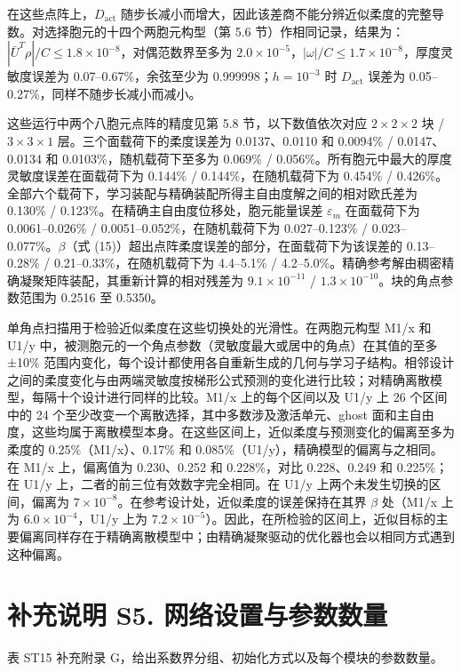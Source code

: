 \documentclass[preprint,12pt,authoryear]{elsarticle}
\begin{document}
在这些点阵上，\(D_{\mathrm{act}}\) 随步长减小而增大，因此该差商不能分辨近似柔度的完整导数。对选择胞元的十四个两胞元构型（第 5.6 节）作相同记录，结果为：\(|\bar U^T\rho|/C\le1.8\times10^{-8}\)，对偶范数界至多为 \(2.0\times10^{-5}\)，\(|\omega|/C\le1.7\times10^{-8}\)，厚度灵敏度误差为 0.07--0.67\%，余弦至少为 0.999998；\(h=10^{-3}\) 时 \(D_{\mathrm{act}}\) 误差为 0.05--0.27\%，同样不随步长减小而减小。

这些运行中两个八胞元点阵的精度见第 5.8 节，以下数值依次对应 \(2\times2\times2\) 块 / \(3\times3\times1\) 层。三个面载荷下的柔度误差为 0.0137、0.0110 和 0.0094\% / 0.0147、0.0134 和 0.0103\%，随机载荷下至多为 0.069\% / 0.056\%。所有胞元中最大的厚度灵敏度误差在面载荷下为 0.144\% / 0.144\%，在随机载荷下为 0.454\% / 0.426\%。全部六个载荷下，学习装配与精确装配所得主自由度解之间的相对欧氏差为 0.130\% / 0.123\%。在精确主自由度位移处，胞元能量误差 \(\varepsilon_m\) 在面载荷下为 0.0061--0.026\% / 0.0051--0.052\%，在随机载荷下为 0.027--0.123\% / 0.023--0.077\%。\(\beta\)（式 (15)）超出点阵柔度误差的部分，在面载荷下为该误差的 0.13--0.28\% / 0.21--0.33\%，在随机载荷下为 4.4--5.1\% / 4.2--5.0\%。精确参考解由稠密精确凝聚矩阵装配，其重新计算的相对残差为 \(9.1\times10^{-11}\) / \(1.3\times10^{-10}\)。块的角点参数范围为 0.2516 至 0.5350。

单角点扫描用于检验近似柔度在这些切换处的光滑性。在两胞元构型 M1/x 和 U1/y 中，被测胞元的一个角点参数（灵敏度最大或居中的角点）在其值的至多 ±10\% 范围内变化，每个设计都使用各自重新生成的几何与学习子结构。相邻设计之间的柔度变化与由两端灵敏度按梯形公式预测的变化进行比较；对精确离散模型，每隔十个设计进行同样的比较。M1/x 上的每个区间以及 U1/y 上 26 个区间中的 24 个至少改变一个离散选择，其中多数涉及激活单元、ghost 面和主自由度，这些均属于离散模型本身。在这些区间上，近似柔度与预测变化的偏离至多为柔度的 0.25\%（M1/x）、0.17\% 和 0.085\%（U1/y），精确模型的偏离与之相同。在 M1/x 上，偏离值为 0.230、0.252 和 0.228\%，对比 0.228、0.249 和 0.225\%；在 U1/y 上，二者的前三位有效数字完全相同。在 U1/y 上两个未发生切换的区间，偏离为 \(7\times10^{-8}\)。在参考设计处，近似柔度的误差保持在其界 \(\beta\) 处（M1/x 上为 \(6.0\times10^{-4}\)，U1/y 上为 \(7.2\times10^{-5}\)）。因此，在所检验的区间上，近似目标的主要偏离同样存在于精确离散模型中；由精确凝聚驱动的优化器也会以相同方式遇到这种偏离。

\section{补充说明 S5. 网络设置与参数数量}

表 ST15 补充附录 G，给出系数界分组、初始化方式以及每个模块的参数数量。
\end{document}
